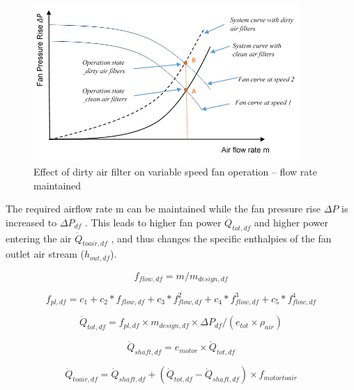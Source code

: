 \begin{figure}[hbtp] %
\centering
\includegraphics[width=0.9\textwidth, height=0.9\textheight, keepaspectratio=true]{media/image8006.png}
\caption{Effect of dirty air filter on variable speed fan operation – flow rate maintained \protect \label{fig:effect-of-dirty-air-filter-on-variable-speed}}
\end{figure}

The required airflow rate m can be maintained while the fan pressure rise \(\Delta P\) is increased to \(\Delta P_{df}\) . This leads to higher fan power \(\dot Q_{tot,df}\) and higher power entering the air \(\dot Q_{toair,df}\) , and thus changes the specific enthalpies of the fan outlet air stream (\(h_{out,df}\)).

\begin{equation}
f_{flow,df} = m / m_{design,df}
\end{equation}

\begin{equation}
f_{pl,df} = c_{1} + c_{2}*f_{flow,df} + c_{3}*f_{flow,df}^2 + c_{4}*f_{flow,df}^3 + c_{5}*f_{flow,df}^4
\end{equation}

\begin{equation}
\dot{Q}_{tot,df} = f_{pl,df} \times m_{design,df} \times \Delta P_{df} / (e_{tot} \times \rho_{air} )
\end{equation}

\begin{equation}
\dot{Q}_{shaft,df} = e_{motor} \times \dot{Q}_{tot, df}
\end{equation}

\begin{equation}
\dot{Q}_{toair,df} = \dot{Q}_{shaft,df} +( \dot{Q}_{tot,df} - \dot{Q}_{shaft,df}) \times f_{motortoair}
\end{equation}


